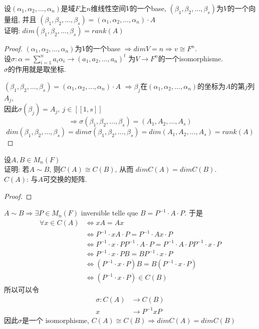 \documentclass{book}
\begin{document}
\begin{example}
设$(\alpha_1, \alpha_2, \ldots, \alpha_n)$是域$F$上$n$维线性空间$V$的一个base, $(\beta_1, \beta_2, \ldots, \beta_s)$为$V$的一个向量组, 并且
$(\beta_1, \beta_2, \ldots, \beta_s) = (\alpha_1, \alpha_2, \ldots, \alpha_n) \cdot A$ \\
证明: $dim(\beta_1, \beta_2, \ldots, \beta_s) = rank(A)$
\end{example}
\begin{proof}
$(\alpha_1, \alpha_2, \ldots, \alpha_n)$为$V$的一个base $\Rightarrow dimV = n \Rightarrow v \cong F^n$. \\
设$\sigma: \alpha = \sum_{i = 1}^n a_i \alpha_i \rightarrow (a_1, a_2, \ldots, a_n)^t$ 为$V \rightarrow F^n$的一个isomorphisme. \\
$\sigma$的作用就是取坐标.

$(\beta_1, \beta_2, \ldots, \beta_s) = (\alpha_1, \alpha_2, \ldots, \alpha_n) \cdot A$
$\Rightarrow \beta_j$在$(\alpha_1, \alpha_2, \ldots, \alpha_n)$的坐标为$A$的第$j$列$A_j$, \\
因此$\sigma(\beta_j) = A_j,~ j \in [[1, s]]$
$$ \Rightarrow \sigma(\beta_1, \beta_2, \ldots, \beta_s) = (A_1, A_2, \ldots, A_s) $$
$$ dim(\beta_1, \beta_2, \ldots, \beta_s) = dim \sigma(\beta_1, \beta_2, \ldots, \beta_s) = dim(A_1, A_2, \ldots, A_s) = rank(A) $$
\end{proof}

\begin{example}
设$A, B \in M_n(F)$ \\
证明: 若$A \sim B$, 则$C(A) \cong C(B)$, 从而 $dim C(A) = dim C(B)$.\\
$C(A)$: 与$A$可交换的矩阵.
\end{example}
\begin{proof}
\end{proof}
$A \sim B \Rightarrow \exists P \in M_n(F)$ inversible telle que $B = P^{-1} \cdot A \cdot P$. 于是
$$
\begin{aligned}
\forall x \in C(A)
& \Leftrightarrow xA = Ax \\
& \Leftrightarrow P^{-1} \cdot xA \cdot P = P^{-1} \cdot Ax \cdot P \\
& \Leftrightarrow P^{-1} \cdot x \cdot P P^{-1} \cdot A \cdot P = P^{-1} \cdot A \cdot P P^{-1} \cdot x \cdot P \\
& \Leftrightarrow P^{-1} \cdot x \cdot P B = B P^{-1} \cdot x \cdot P \\
& \Leftrightarrow (P^{-1} \cdot x \cdot P) B = B (P^{-1} \cdot x \cdot P) \\
& \Leftrightarrow (P^{-1} \cdot x \cdot P) \in C(B)
\end{aligned}
$$
所以可以令
$$
\begin{aligned}
\sigma: C(A) & \rightarrow C(B) \\
		 x   & \rightarrow P^{-1} x P
\end{aligned}
$$
因此$\sigma$是一个 isomorphisme, $C(A) \cong C(B) \Rightarrow dim C(A) = dim C(B)$
\end{document}
